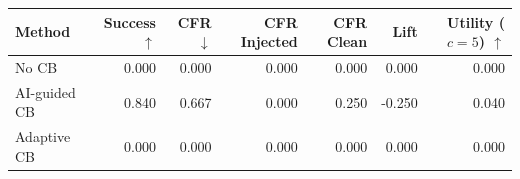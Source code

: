 \begin{tabular}{lrrrrrr}
\toprule
Method & Success $\uparrow$ & CFR $\downarrow$ & CFR Injected & CFR Clean & Lift & Utility ($c=5$) $\uparrow$ \\
\midrule
No CB & 0.000 & 0.000 & 0.000 & 0.000 & 0.000 & 0.000 \\
AI-guided CB & 0.840 & 0.667 & 0.000 & 0.250 & -0.250 & 0.040 \\
Adaptive CB & 0.000 & 0.000 & 0.000 & 0.000 & 0.000 & 0.000 \\
\bottomrule
\end{tabular}
